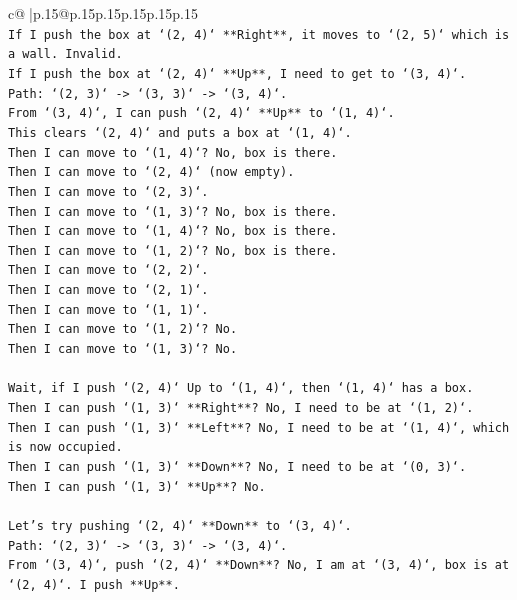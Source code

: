\documentclass{article}
\begin{document}
{\begin{supertabular}{c@{$\;$}|p{.15\linewidth}@{}p{.15\linewidth}p{.15\linewidth}p{.15\linewidth}p{.15\linewidth}p{.15\linewidth}}
{{{\\ 
\texttt{If I push the box at `(2, 4)` **Right**, it moves to `(2, 5)` which is a wall. Invalid.} \\
\texttt{If I push the box at `(2, 4)` **Up**, I need to get to `(3, 4)`.} \\
\texttt{Path: `(2, 3)` {-}> `(3, 3)` {-}> `(3, 4)`.} \\
\texttt{From `(3, 4)`, I can push `(2, 4)` **Up** to `(1, 4)`.} \\
\texttt{This clears `(2, 4)` and puts a box at `(1, 4)`.} \\
\texttt{Then I can move to `(1, 4)`? No, box is there.} \\
\texttt{Then I can move to `(2, 4)` (now empty).} \\
\texttt{Then I can move to `(2, 3)`.} \\
\texttt{Then I can move to `(1, 3)`? No, box is there.} \\
\texttt{Then I can move to `(1, 4)`? No, box is there.} \\
\texttt{Then I can move to `(1, 2)`? No, box is there.} \\
\texttt{Then I can move to `(2, 2)`.} \\
\texttt{Then I can move to `(2, 1)`.} \\
\texttt{Then I can move to `(1, 1)`.} \\
\texttt{Then I can move to `(1, 2)`? No.} \\
\texttt{Then I can move to `(1, 3)`? No.} \\
\\ 
\texttt{Wait, if I push `(2, 4)` Up to `(1, 4)`, then `(1, 4)` has a box.} \\
\texttt{Then I can push `(1, 3)` **Right**? No, I need to be at `(1, 2)`.} \\
\texttt{Then I can push `(1, 3)` **Left**? No, I need to be at `(1, 4)`, which is now occupied.} \\
\texttt{Then I can push `(1, 3)` **Down**? No, I need to be at `(0, 3)`.} \\
\texttt{Then I can push `(1, 3)` **Up**? No.} \\
\\ 
\texttt{Let's try pushing `(2, 4)` **Down** to `(3, 4)`.} \\
\texttt{Path: `(2, 3)` {-}> `(3, 3)` {-}> `(3, 4)`.} \\
\texttt{From `(3, 4)`, push `(2, 4)` **Down**? No, I am at `(3, 4)`, box is at `(2, 4)`. I push **Up**.} \\
}}}
\end{supertabular}}
\end{document}

